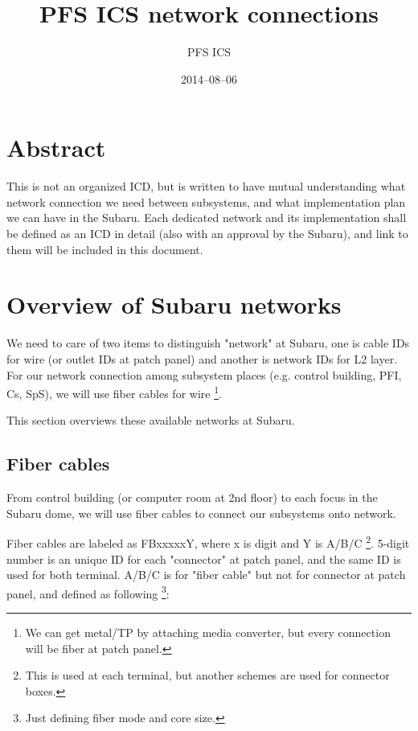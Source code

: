 \documentclass[a4paper,notitlepage]{article}
\title{PFS ICS network connections}
\author{PFS ICS}
\date{2014--08--06}
\begin{document}
{}

\ssnhead

\section{Abstract}

This is not an organized ICD, but is written to have mutual understanding 
what network connection we need between subsystems, and what implementation 
plan we can have in the Subaru. 
Each dedicated network and its implementation shall be defined as an ICD 
in detail (also with an approval by the Subaru), and link to them will be 
included in this document. 


\section{Overview of Subaru networks}

We need to care of two items to distinguish "network" at Subaru, one is 
cable IDs for wire (or outlet IDs at patch panel) 
and another is network IDs for L2 layer. 
For our network connection among subsystem places (e.g. control building, 
PFI, Cs, SpS), we will use fiber cables for wire
\footnote{We can get metal/TP by attaching media converter, but every 
connection will be fiber at patch panel.}. 

This section overviews these available networks at Subaru. 

\subsection{Fiber cables}

From control building (or computer room at 2nd floor) to each focus in the 
Subaru dome, we will use fiber cables to connect our subsystems onto network. 

Fiber cables are labeled as FBxxxxxY, where x is digit and Y is A/B/C
\footnote{This is used at each terminal, but another schemes are used for 
connector boxes.}. 
5-digit number is an unique ID for each "connector" at patch panel, and the 
same ID is used for both terminal. 
A/B/C is for "fiber cable" but not for connector at patch panel, 
and defined as following
\footnote{Just defining fiber mode and core size.}: 
\end{document}
